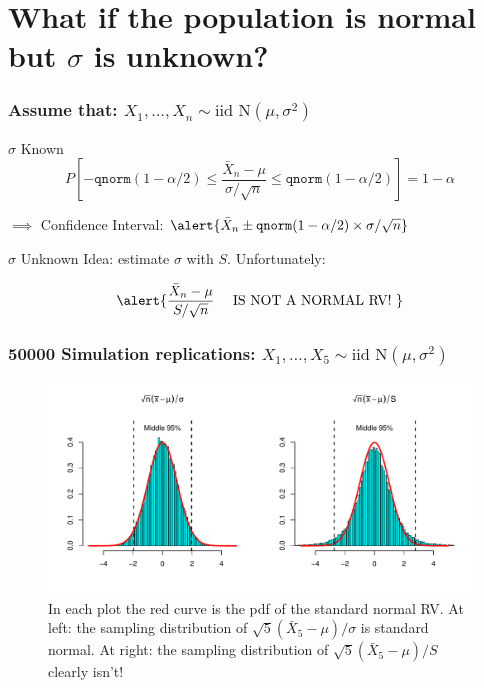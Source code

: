 \section{What if the population is normal but $\sigma$ is unknown?}
\begin{frame}
  \frametitle{Assume that: $X_1, \dots, X_n \sim \text{iid N}(\mu, \sigma^2)$}

\begin{block}{$\sigma$ Known}
  \[P\left[ -\texttt{qnorm}(1 - \alpha/2) \leq \frac{\bar{X}_n - \mu}{\sigma/\sqrt{n}}\leq \texttt{qnorm}(1 - \alpha/2) \right] = 1 - \alpha\]

  \pause

  \vspace{1em}
  $\implies$ Confidence Interval: $\alert{\bar{X}_n \pm \texttt{qnorm}(1 - \alpha/2) \times \sigma/ \sqrt{n}}$
\end{block}

\pause

\begin{block}{$\sigma$ Unknown}
  Idea: estimate $\sigma$ with $S$. Unfortunately: 

  \[
    \alert{\frac{\bar{X}_n - \mu}{S/\sqrt{n}} \quad \text{ IS NOT A NORMAL RV! }}
  \]

\end{block}

\end{frame}
\begin{frame}
  \frametitle{50000 Simulation replications: $X_1, \dots, X_5 \sim \text{iid N}(\mu, \sigma^2)$}

  \vspace{3em}

  \begin{figure}
    \centering
\includegraphics[scale = 0.45, trim = 2cm 2cm 2cm 2cm]{./images/normal_vs_t_sampling}
\caption{In each plot the red curve is the pdf of the standard normal RV. At left: the sampling distribution of $\sqrt{5}(\bar{X}_5 - \mu)/\sigma$ is standard normal. At right: the sampling distribution of $\sqrt{5}(\bar{X}_5 - \mu)/S$ clearly isn't!}
\end{figure}

\end{frame}

